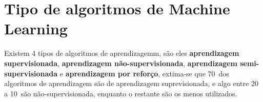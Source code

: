\section{Tipo de algoritmos de Machine Learning}
\label{sec:ml-types}

Existem 4 tipos de algoritmos de aprendizagemm, são eles \textbf{aprendizagem supervisionada}, \textbf{aprendizagem não-supervisionada},
\textbf{aprendizagem semi-supervisionada} e \textbf{aprendizagem por reforço}, extima-se que 70\ dos algoritmos de aprendizagem são de 
aprendizagem suprevisionada, e algo entre 20 a 10\ são não-supervisionada, enquanto o restante são os menos utilizados.



